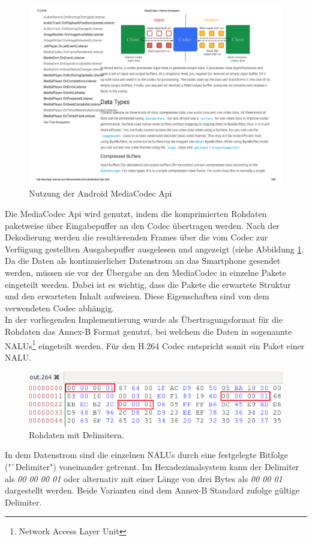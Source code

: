 \begin{figure}[h]
	\includegraphics{Bilder/BildakquiseUndDatenaufbereitung/mediacodec.pdf}
	\caption[Nutzung der Android MediaCodec Api]{Nutzung der Android MediaCodec Api\footnotemark}
	\label{fig:media_codec}
\end{figure}
Die MediaCodec Api wird genutzt, indem die komprimierten Rohdaten paketweise über Eingabepuffer an den Codec übertragen werden. Nach der Dekodierung werden die resultierenden Frames über die vom Codec zur Verfügung gestellten Ausgabepuffer ausgelesen und angezeigt (siehe Abbildung \ref{fig:media_codec}.\\
Da die Daten als kontinuierlicher Datenstrom an das Smartphone gesendet werden, müssen sie vor der Übergabe an den MediaCodec in einzelne Pakete eingeteilt werden. Dabei ist es wichtig, dass die Pakete die erwartete Struktur und den erwarteten Inhalt aufweisen. Diese Eigenschaften sind von dem verwendeten Codec abhängig.\\
In der vorliegenden Implementierung wurde als Übertragungsformat für die Rohdaten das Annex-B Format genutzt, bei welchem die Daten in sogenannte NALUs\footnote{Network Access Layer Unit} eingeteilt werden. Für den H.264 Codec entspricht somit ein Paket einer NALU.\\
\begin{figure}[H]
	\includegraphics{Bilder/BildakquiseUndDatenaufbereitung/NALUs.png}
	\caption{Rohdaten mit Delimitern.}
	\label{fig:nalus_delimiter}
\end{figure}
In dem Datenstrom sind die einzelnen NALUs durch eine festgelegte Bitfolge ("`Delimiter") voneinander getrennt. Im Hexadezimalsystem kann der Delimiter als \textit{00 00 00 01} oder alternativ mit einer Länge von drei Bytes als \textit{00 00 01} dargestellt werden. Beide Varianten sind dem Annex-B Standard zufolge gültige Delimiter.\\

